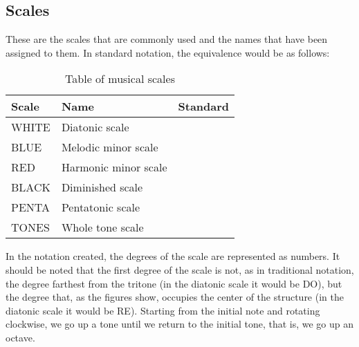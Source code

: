 \documentclass[]{report}
\begin{document}
\subsection{Scales}
These are the scales that are commonly used and the names that have been assigned to them. In standard notation, the equivalence would be as follows:
\begin{table}[htbp]
\centering
\begin{tabular}{lll}
\toprule
\textbf{\textsf{Scale}} & \textbf{Name} & \textbf{Standard} \\
\midrule
\textsf{WHITE} & Diatonic scale & \\
\textsf{BLUE} & Melodic minor scale & \\
\textsf{RED} & Harmonic minor scale & \\
\textsf{BLACK} & Diminished scale & \\
\textsf{PENTA} & Pentatonic scale & \\
\textsf{TONES} & Whole tone scale & \\
\bottomrule
\end{tabular}
\caption{Table of musical scales}\label{tab:scale-name-equivalences}
\end{table}
In the notation created, the degrees of the scale are represented as numbers. It should be noted that the first degree of the scale is not, as in traditional notation, the degree farthest from the tritone (in the diatonic scale it would be DO), but the degree that, as the figures show, occupies the center of the structure (in the diatonic scale it would be RE). Starting from the initial note and rotating clockwise, we go up a tone until we return to the initial tone, that is, we go up an octave.
\end{document}

